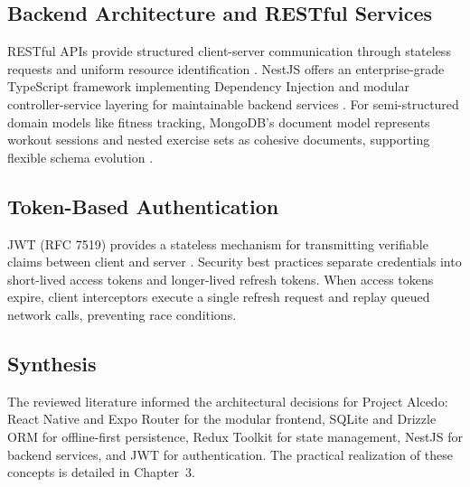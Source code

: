 \subsection{Backend Architecture and RESTful Services}
RESTful APIs provide structured client-server communication through stateless requests and uniform resource identification \citep{fielding2000}. NestJS offers an enterprise-grade TypeScript framework implementing Dependency Injection and modular controller-service layering for maintainable backend services \citep{martin2008clean}. For semi-structured domain models like fitness tracking, MongoDB's document model represents workout sessions and nested exercise sets as cohesive documents, supporting flexible schema evolution \citep{tilkov2010node}.

\subsection{Token-Based Authentication}
JWT (RFC 7519) provides a stateless mechanism for transmitting verifiable claims between client and server \citep{jones2015jwt}. Security best practices separate credentials into short-lived access tokens and longer-lived refresh tokens. When access tokens expire, client interceptors execute a single refresh request and replay queued network calls, preventing race conditions.

\subsection{Synthesis}
The reviewed literature informed the architectural decisions for Project Alcedo: React Native and Expo Router for the modular frontend, SQLite and Drizzle ORM for offline-first persistence, Redux Toolkit for state management, NestJS for backend services, and JWT for authentication. The practical realization of these concepts is detailed in Chapter~3.